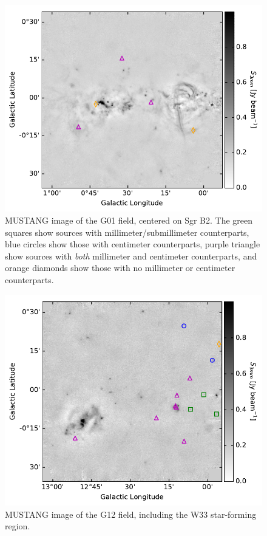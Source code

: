 \documentclass[twocolumn]{aastex62}
\begin{document}
\begin{figure}[htp]
\includegraphics[width=17cm]{figures/G01_overview_withcatalog.pdf}
\caption{MUSTANG image of the G01 field, centered on Sgr B2.  The green squares show
sources with millimeter/submillimeter counterparts, blue circles show those
with centimeter counterparts, purple triangle show sources with \emph{both} millimeter
and centimeter counterparts, and orange diamonds show those with no millimeter
or centimeter counterparts.}
\label{fig:g01overview}
\end{figure}

\begin{figure}[htp]
\includegraphics[width=17cm]{figures/G12_overview_withcatalog.pdf}
\caption{MUSTANG image of the G12 field, including the W33 star-forming region.}
\label{fig:g12overview}
\end{figure}
\end{document}
